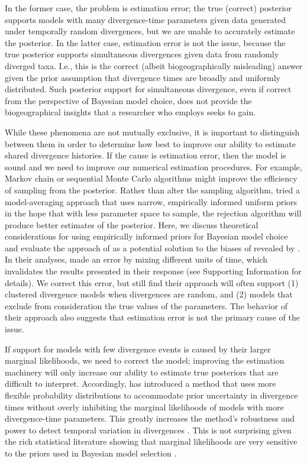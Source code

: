 In the former case, the problem is estimation error; the true (correct)
posterior supports models with many divergence-time parameters given data
generated under temporally random divergences, but we are unable to accurately
estimate the posterior.
In the latter case, estimation error is not the issue, because the true
posterior supports simultaneous divergences given data from randomly diverged
taxa.
I.e., this is the correct (albeit biogeographically misleading) answer given
the prior assumption that divergence times are broadly and uniformly
distributed.
Such posterior support for simultaneous divergence, even if correct from the
perspective of Bayesian model choice, does not provide the biogeographical
insights that a researcher who employs \msb seeks to gain.

While these phenomena are not mutually exclusive, it is important to
distinguish between them in order to determine how best to improve our ability
to estimate shared divergence histories.
If the cause is estimation error, then the model is sound and we need to
improve our numerical estimation procedures.
For example, Markov chain or sequential Monte Carlo algorithms might improve
the efficiency of sampling from the posterior.
Rather than alter the sampling algorithm, \citet{Hickerson2013} tried a
model-averaging approach that uses narrow, empirically informed uniform priors
in the hope that with less parameter space to sample, the rejection algorithm
will produce better estimates of the posterior.
Here, we discuss theoretical considerations for using empirically informed
priors for Bayesian model choice and evaluate the approach of
\citet{Hickerson2013} as a potential solution to the biases of \msb revealed by
\citet{Oaks2012}.
In their analyses, \citet{Hickerson2013} made an error by mixing different
units of time, which invalidates the results presented in their response (see
Supporting Information for details).
We correct this error, but still find their approach will often support
(1) clustered divergence models when divergences are random, and
(2) models that exclude from consideration the true values of the
parameters.
The behavior of their approach also suggests that estimation error is not the
primary cause of the issue.

If support for models with few divergence events is caused by their larger
marginal likelihoods, we need to correct the model; improving the estimation
machinery will only increase our ability to estimate true posteriors that are
difficult to interpret.
Accordingly, \citet{Oaks2014dpp} has introduced a method that uses more
flexible probability distributions to accommodate prior uncertainty in
divergence times without overly inhibiting the marginal likelihoods of models
with more divergence-time parameters.
This greatly increases the method's robustness and power to detect temporal
variation in divergences \citep{Oaks2014dpp}.
This is not surprising given the rich statistical literature showing that
marginal likelihoods are very sensitive to the priors used in Bayesian model
selection
\citep[e.g.,][]{Jeffreys1939,Lindley1957}.

